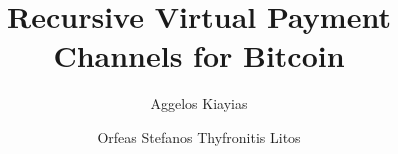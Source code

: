 \title{Recursive Virtual Payment Channels for Bitcoin}
\author{Aggelos Kiayias \and Orfeas Stefanos Thyfronitis Litos}
%
\maketitle
